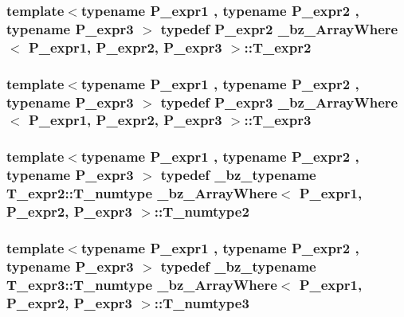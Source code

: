 \subsubsection[{T\+\_\+expr2}]{\setlength{\rightskip}{0pt plus 5cm}template$<$typename P\+\_\+expr1 , typename P\+\_\+expr2 , typename P\+\_\+expr3 $>$ typedef P\+\_\+expr2 {\bf \+\_\+bz\+\_\+\+Array\+Where}$<$ P\+\_\+expr1, P\+\_\+expr2, P\+\_\+expr3 $>$\+::{\bf T\+\_\+expr2}}\label{class__bz__ArrayWhere_aa417b5b88df486cc569c08a17c071aac}
\hypertarget{class__bz__ArrayWhere_a45f842d24f1a76bd7b277cc81c4a1168}{}
\subsubsection[{T\+\_\+expr3}]{\setlength{\rightskip}{0pt plus 5cm}template$<$typename P\+\_\+expr1 , typename P\+\_\+expr2 , typename P\+\_\+expr3 $>$ typedef P\+\_\+expr3 {\bf \+\_\+bz\+\_\+\+Array\+Where}$<$ P\+\_\+expr1, P\+\_\+expr2, P\+\_\+expr3 $>$\+::{\bf T\+\_\+expr3}}\label{class__bz__ArrayWhere_a45f842d24f1a76bd7b277cc81c4a1168}
\hypertarget{class__bz__ArrayWhere_ab9f464ff11ad352449616df25015af39}{}
\subsubsection[{T\+\_\+numtype2}]{\setlength{\rightskip}{0pt plus 5cm}template$<$typename P\+\_\+expr1 , typename P\+\_\+expr2 , typename P\+\_\+expr3 $>$ typedef {\bf \+\_\+bz\+\_\+typename} T\+\_\+expr2\+::\+T\+\_\+numtype {\bf \+\_\+bz\+\_\+\+Array\+Where}$<$ P\+\_\+expr1, P\+\_\+expr2, P\+\_\+expr3 $>$\+::{\bf T\+\_\+numtype2}}\label{class__bz__ArrayWhere_ab9f464ff11ad352449616df25015af39}
\hypertarget{class__bz__ArrayWhere_a783ce23201ab34ad6e6e9f6d490102e3}{}
\subsubsection[{T\+\_\+numtype3}]{\setlength{\rightskip}{0pt plus 5cm}template$<$typename P\+\_\+expr1 , typename P\+\_\+expr2 , typename P\+\_\+expr3 $>$ typedef {\bf \+\_\+bz\+\_\+typename} T\+\_\+expr3\+::\+T\+\_\+numtype {\bf \+\_\+bz\+\_\+\+Array\+Where}$<$ P\+\_\+expr1, P\+\_\+expr2, P\+\_\+expr3 $>$\+::{\bf T\+\_\+numtype3}}\label{class__bz__ArrayWhere_a783ce23201ab34ad6e6e9f6d490102e3}



